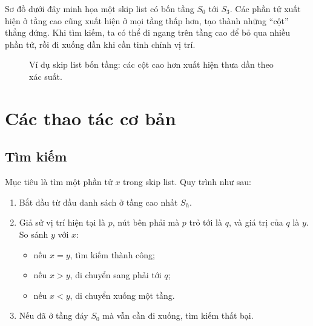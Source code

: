\documentclass[11pt]{article}
\begin{document}
Sơ đồ dưới đây minh họa một skip list có bốn tầng \(S_0\) tới \(S_3\).
Các phần tử xuất hiện ở tầng cao cũng xuất hiện ở mọi tầng thấp hơn, tạo thành
những ``cột'' thẳng đứng. Khi tìm kiếm, ta có thể đi ngang trên tầng cao để bỏ
qua nhiều phần tử, rồi đi xuống dần khi cần tinh chỉnh vị trí.

\begin{figure}[ht]
\centering
{}
\caption{Ví dụ skip list bốn tầng: các cột cao hơn xuất hiện thưa dần theo xác suất.}
\end{figure}

\section{Các thao tác cơ bản}

\subsection{Tìm kiếm}

Mục tiêu là tìm một phần tử \(x\) trong skip list. Quy trình như sau:
\begin{enumerate}
  \item Bắt đầu từ đầu danh sách ở tầng cao nhất \(S_h\).
  \item Giả sử vị trí hiện tại là \(p\), nút bên phải mà \(p\) trỏ tới là
  \(q\), và giá trị của \(q\) là \(y\). So sánh \(y\) với \(x\):
  \begin{itemize}
    \item nếu \(x=y\), tìm kiếm thành công;
    \item nếu \(x>y\), di chuyển sang phải tới \(q\);
    \item nếu \(x<y\), di chuyển xuống một tầng.
  \end{itemize}
  \item Nếu đã ở tầng đáy \(S_0\) mà vẫn cần đi xuống, tìm kiếm thất bại.
\end{enumerate}
\end{document}
